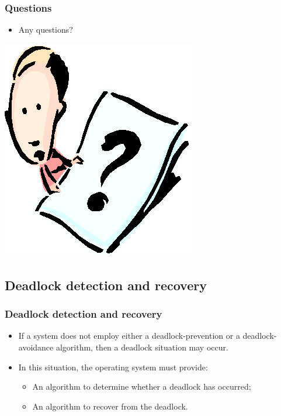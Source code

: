 \documentclass[CJKutf8,xcolor=pdftex,dvipsnames,table]{beamer}
\begin{document}
\begin{CJK*}{UTF8}{song}
  \begin{frame}
  \frametitle{Questions}
  \begin{itemize}
  \item{Any questions?}
  \end{itemize}
  \begin{center}
    \includegraphics[scale=.5]{question}
  \end{center}
  \end{frame}

\subsection{Deadlock detection and recovery}

  \begin{frame}
  \frametitle{Deadlock detection and recovery} \pause
  \begin{itemize}
  \item{If a system does not employ either a deadlock-prevention or a deadlock-avoidance algorithm, then a deadlock situation may occur.} \pause
  \item{In this situation, the operating system must provide:} \pause
    \begin{itemize}
    \item{An algorithm to determine whether a deadlock has occurred;} \pause
    \item{An algorithm to recover from the deadlock.}
    \end{itemize}
  \end{itemize}
  \end{frame}


\end{CJK*}
\end{document}

